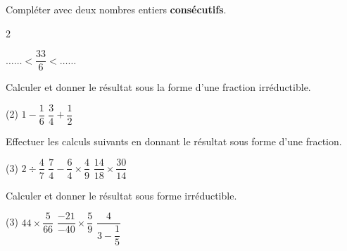 \documentclass[a4paper,11pt,fleqn]{article}
\begin{document}
% 
% 
% 

\begin{EXO}{}{}
Compléter avec deux nombres entiers \textbf{consécutifs}.

\begin{multicols}{2}
 \begin{minipage}[t]{\linewidth} $\ldots\ldots$$ < \dfrac{33}{6} < $$\ldots\ldots$ \end{minipage}
\end{multicols}
\end{EXO}

\begin{EXO}{}{}
Calculer et donner le résultat sous la forme d’une fraction irréductible.


\begin{tasks}(2)
	\task $1 - \dfrac{1}{6}$
	\task $\dfrac{3}{4} + \dfrac{1}{2}$
\end{tasks}
\end{EXO}

\begin{EXO}{}{}
Effectuer les calculs suivants en donnant le résultat sous forme d'une fraction.

 \begin{tasks}(3)
	\task $2 \div  \dfrac{4}{7} $
	\task $\dfrac{7}{4} - \dfrac{6}{4} \times \dfrac{4}{9}$ 
    \task $\dfrac{14}{18}\times \dfrac{30}{14}$
 \end{tasks}
\end{EXO}

\begin{EXO}{}{}
Calculer et donner le résultat sous forme irréductible.


 \begin{tasks}(3)
	\task $44\times\dfrac{5}{66}$
	\task $\dfrac{-21}{-40}\times\dfrac{5}{9}$
    \task $\dfrac{4}{3-\dfrac{1}{5}}$
 \end{tasks}
\end{EXO}
\end{document}
